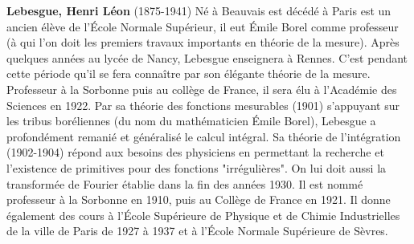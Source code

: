 \textbf{Lebesgue, Henri Léon} (1875-1941) Né à Beauvais est décédé à Paris est un ancien élève de l'École Normale Supérieur, il eut Émile Borel comme professeur (à qui l'on doit les premiers travaux importants en théorie de la mesure). Après quelques années au lycée de Nancy, Lebesgue enseignera à Rennes. C'est pendant cette période qu'il se fera connaître par son élégante théorie de la mesure. Professeur à la Sorbonne puis au collège de France, il sera élu à l'Académie des Sciences en 1922. Par sa théorie des fonctions mesurables (1901) s'appuyant sur les tribus boréliennes  (du nom du mathématicien Émile Borel), Lebesgue a profondément remanié et généralisé le calcul intégral. Sa théorie de l'intégration (1902-1904) répond aux besoins des physiciens en permettant la recherche et l'existence de primitives pour des fonctions "irrégulières". On lui doit aussi la transformée de Fourier établie dans la fin des années 1930. Il est nommé professeur à la Sorbonne en 1910, puis au Collège de France en 1921. Il donne également des cours à l'École Supérieure de Physique et de Chimie Industrielles de la ville de Paris de 1927 à 1937 et à l'École Normale Supérieure de Sèvres.

